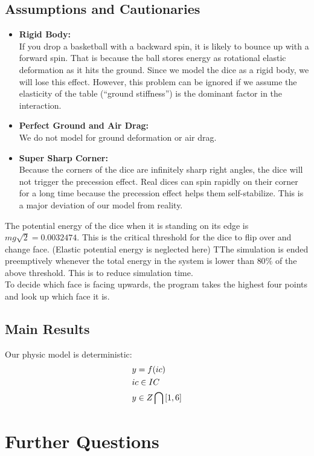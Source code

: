 \documentclass[12pt]{article}
\begin{document}
\subsection{Assumptions and Cautionaries}
\begin{itemize}
  \item \textbf{Rigid Body:}\\
If you drop a basketball with a backward spin, it is likely to bounce up with a forward spin. That is because the ball stores energy as rotational elastic deformation as it hits the ground. Since we model the dice as a rigid body, we will lose this effect. However, this problem can be ignored if we assume the elasticity of the table (“ground stiffness”) is the dominant factor in the interaction. 
  \item \textbf{Perfect Ground and Air Drag:}\\
We do not model for ground deformation or air drag. 
  \item \textbf{Super Sharp Corner:}\\
Because the corners of the dice are infinitely sharp right angles, the dice will not trigger the precession effect. Real dices can spin rapidly on their corner for a long time because the precession effect helps them self-stabilize. This is a major deviation of our model from reality. 
\end{itemize}
The potential energy of the dice when it is standing on its edge is $mg\sqrt{2}=0.0032474$. This is the critical threshold for the dice to flip over and change face. (Elastic potential energy is neglected here)
TThe simulation is ended preemptively whenever the total energy in the system is lower than $80\%$ of the above threshold. This is to reduce simulation time.\\
To decide which face is facing upwards, the program takes the highest four points and look up which face it is.\\

\subsection{Main Results}
Our physic model is deterministic:\\
\begin{equation}
\aligned
&y=f(ic)\\
&ic\in IC\\
&y \in Z\bigcap\left[{1,6}\right]
\endaligned
\end{equation}


\section{Further Questions}
\end{document}
